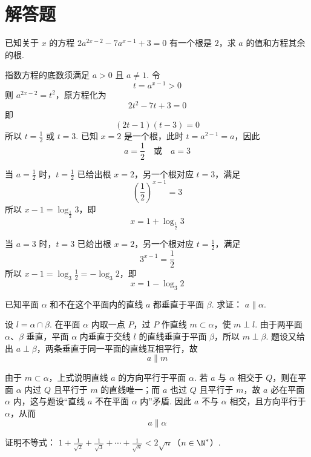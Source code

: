 \documentclass[UTF8,a4paper,oneside,11pt]{ctexbook}
\begin{document}
\section{解答题}

\begin{problem}
已知关于 \(x\) 的方程 \(2a^{2x-2}-7a^{x-1}+3=0\) 有一个根是 \(2\)，求 \(a\) 的值和方程其余的根.
\end{problem}

\begin{solution}
指数方程的底数须满足 \(a>0\) 且 \(a\ne1\). 令
\[
t=a^{x-1}>0
\]
则 \(a^{2x-2}=t^2\)，原方程化为
\[
2t^2-7t+3=0
\]
即
\[
(2t-1)(t-3)=0
\]
所以 \(t=\frac12\) 或 \(t=3\). 已知 \(x=2\) 是一个根，此时 \(t=a^{2-1}=a\)，因此
\[
a=\frac12\quad\text{或}\quad a=3
\]

当 \(a=\frac12\) 时，\(t=\frac12\) 已给出根 \(x=2\)，另一个根对应 \(t=3\)，满足
\[
\left(\frac12\right)^{x-1}=3
\]
所以 \(x-1=\log_{\frac12}3\)，即
\[
x=1+\log_{\frac12}3
\]

当 \(a=3\) 时，\(t=3\) 已给出根 \(x=2\)，另一个根对应 \(t=\frac12\)，满足
\[
3^{x-1}=\frac12
\]
所以 \(x-1=\log_3\frac12=-\log_3 2\)，即
\[
x=1-\log_3 2
\]
\end{solution}

\begin{problem}
已知平面 \(\alpha\) 和不在这个平面内的直线 \(a\) 都垂直于平面 \(\beta\). 求证： \(a\parallel \alpha\).
\end{problem}

\begin{solution}
设 \(l=\alpha\cap\beta\). 在平面 \(\alpha\) 内取一点 \(P\)，过 \(P\) 作直线 \(m\subset\alpha\)，使 \(m\perp l\). 由于两平面 \(\alpha\)、\(\beta\) 垂直，平面 \(\alpha\) 内垂直于交线 \(l\) 的直线垂直于平面 \(\beta\)，所以 \(m\perp\beta\). 题设又给出 \(a\perp\beta\)，两条垂直于同一平面的直线互相平行，故
\[
a\parallel m
\]

由于 \(m\subset\alpha\)，上式说明直线 \(a\) 的方向平行于平面 \(\alpha\). 若 \(a\) 与 \(\alpha\) 相交于 \(Q\)，则在平面 \(\alpha\) 内过 \(Q\) 且平行于 \(m\) 的直线唯一；而 \(a\) 也过 \(Q\) 且平行于 \(m\)，故 \(a\) 必在平面 \(\alpha\) 内，这与题设“直线 \(a\) 不在平面 \(\alpha\) 内”矛盾. 因此 \(a\) 不与 \(\alpha\) 相交，且方向平行于 \(\alpha\)，从而
\[
a\parallel\alpha
\]
\end{solution}

\begin{problem}
证明不等式： \(1+\frac{1}{\sqrt{2}}+\frac{1}{\sqrt{3}}+\cdots+\frac{1}{\sqrt{n}}<2\sqrt{n}\)（\(n\in \N^*\)）.
\end{problem}
\end{document}

